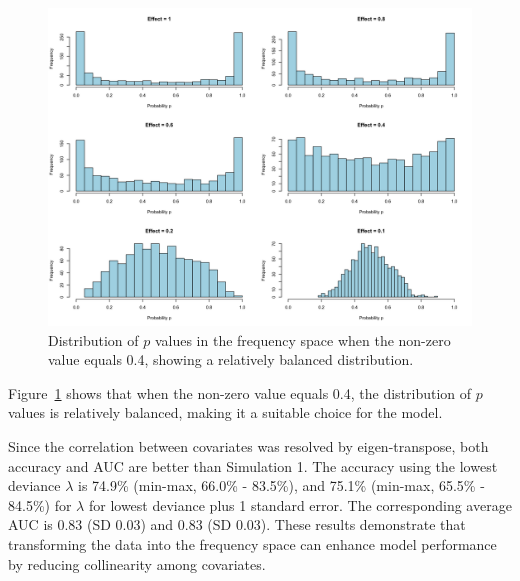 \documentclass[12pt]{article}
\begin{document}
\begin{figure}[H]
    \centering
    \includegraphics[width=\textwidth]{../Figures/sim2_p_dist.png}
    \caption{Distribution of \(p\) values in the frequency space when the non-zero value equals 0.4, showing a relatively balanced distribution.}
    \label{fig:sim2_p_dist}
\end{figure}

Figure~\ref{fig:sim2_p_dist} shows that when the non-zero value equals 0.4, the distribution of \(p\) values is relatively balanced, making it a suitable choice for the model.

Since the correlation between covariates was resolved by eigen-transpose, both accuracy and AUC are better than Simulation 1. The accuracy using the lowest deviance \(\lambda\) is 74.9\% (min-max, 66.0\% - 83.5\%), and 75.1\% (min-max, 65.5\% - 84.5\%) for \(\lambda\) for lowest deviance plus 1 standard error. The corresponding average AUC is 0.83 (SD 0.03) and 0.83 (SD 0.03). These results demonstrate that transforming the data into the frequency space can enhance model performance by reducing collinearity among covariates.
\end{document}
